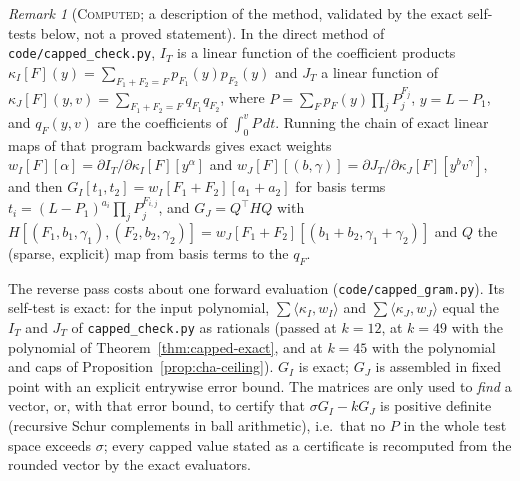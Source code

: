 \documentclass[11pt]{amsart}
\theoremstyle{definition}
\theoremstyle{remark}
\newtheorem{remark}[theorem]{Remark}
\newcommand{\lbl}[1]{\textup{\textsc{#1}}}
\begin{document}
\begin{remark}[\lbl{Computed}; a description of the method, validated by the exact self-tests below, not a proved statement]\label{prop:adjoint}
In the direct method of \texttt{code/capped\_check.py}, $I_T$ is a linear
function of the coefficient products
$\kappa_I[F](y)=\sum_{F_1+F_2=F}p_{F_1}(y)p_{F_2}(y)$ and $J_T$ a linear
function of $\kappa_J[F](y,v)=\sum_{F_1+F_2=F}q_{F_1}q_{F_2}$, where
$P=\sum_Fp_F(y)\prod_jP_j^{F_j}$, $y=L-P_1$, and
$q_F(y,v)$ are the coefficients of $\int_0^vP\,dt$. Running the chain of
exact linear maps of that program backwards gives exact weights
$w_I[F][\alpha]=\partial I_T/\partial\kappa_I[F][y^\alpha]$ and
$w_J[F][(b,\gamma)]=\partial J_T/\partial\kappa_J[F][y^bv^\gamma]$, and then
$G_I[t_1,t_2]=w_I[F_1+F_2][a_1+a_2]$ for basis terms
$t_i=(L-P_1)^{a_i}\prod_jP_j^{F_{i,j}}$, and $G_J=Q^{\top}HQ$ with
$H[(F_1,b_1,\gamma_1),(F_2,b_2,\gamma_2)]=w_J[F_1+F_2][(b_1+b_2,\gamma_1+\gamma_2)]$
and $Q$ the (sparse, explicit) map from basis terms to the $q_F$.
\end{remark}
\begin{sloppypar}
The reverse pass costs about one forward evaluation
(\texttt{code/capped\_gram.py}). Its self-test is exact: for the input
polynomial, $\sum\langle\kappa_I,w_I\rangle$ and
$\sum\langle\kappa_J,w_J\rangle$ equal the $I_T$ and $J_T$ of
\texttt{capped\_check.py} as rationals (passed at $k=12$, at $k=49$ with the
polynomial of Theorem~\ref{thm:capped-exact}, and at $k=45$ with the
polynomial and caps of Proposition~\ref{prop:cha-ceiling}). $G_I$ is exact; $G_J$ is assembled in fixed point
with an explicit entrywise error bound. The matrices are only used to
\emph{find} a vector, or, with that error bound, to certify that
$\sigma G_I-kG_J$ is positive definite (recursive Schur complements in ball
arithmetic), i.e.\ that no $P$ in the whole test space exceeds $\sigma$; every capped value stated as a
certificate is recomputed from the rounded vector by the exact evaluators.
\end{sloppypar}
\end{document}
